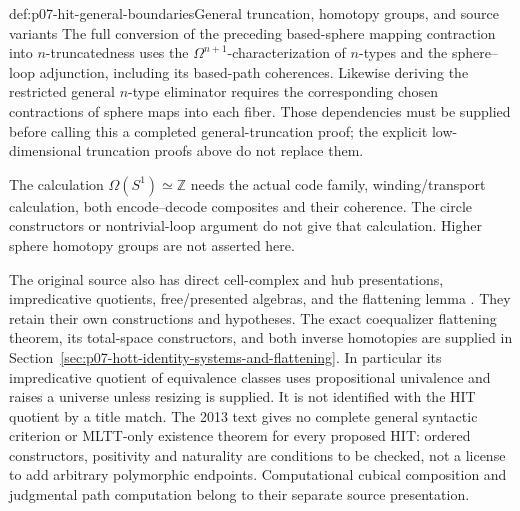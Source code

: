 \begin{proofboundary}{def:p07-hit-general-boundaries}{General truncation, homotopy groups, and source variants}
The full conversion of the preceding based-sphere mapping contraction into
\(n\)-truncatedness uses the \(\Omega^{n+1}\)-characterization of
\(n\)-types and the sphere--loop adjunction, including its based-path
coherences. Likewise deriving the restricted general \(n\)-type eliminator
requires the corresponding chosen contractions of sphere maps into each
fiber. Those dependencies must be supplied before calling this a completed
general-truncation proof; the explicit low-dimensional truncation proofs above
do not replace them.

The calculation \(\Omega(S^1)\simeq\mathbb Z\) needs the actual code
family, winding/transport calculation, both encode--decode composites and their
coherence. The circle constructors or nontrivial-loop argument do not give
that calculation. Higher sphere homotopy groups are not asserted here.

The original source also has direct cell-complex and hub presentations,
impredicative quotients, free/presented algebras, and the flattening lemma
\cite[\S\S6.6--6.7, 6.10--6.13]{HoTT2013PublicReleaseFoundations}. They retain their
own constructions and hypotheses. The exact coequalizer flattening theorem,
its total-space constructors, and both inverse homotopies are supplied in
Section~\ref{sec:p07-hott-identity-systems-and-flattening}.
In particular its impredicative
quotient of equivalence classes uses propositional univalence and raises a
universe unless resizing is supplied. It is not identified with the HIT
quotient by a title match. The 2013 text gives no complete general syntactic
criterion or MLTT-only existence theorem for every proposed HIT: ordered
constructors, positivity and naturality are conditions to be checked, not a
license to add arbitrary polymorphic endpoints. Computational cubical
composition and judgmental path computation belong to their separate source
presentation.
\end{proofboundary}
